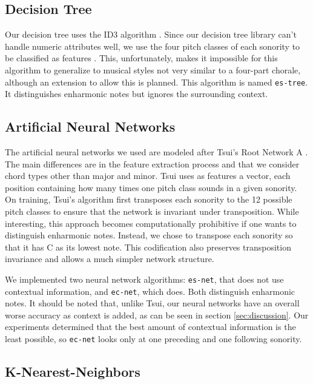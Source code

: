 \documentclass{article}
\begin{document}
\subsection{Decision Tree}
\label{sec:tree}

Our decision tree uses the ID3 algorithm \cite{mitchell:machine}.
Since our decision tree library can't handle numeric attributes well,
we use the four pitch classes of each sonority to be classified as
features . This, unfortunately, makes it impossible for this algorithm
to generalize to musical styles not very similar to a four-part
chorale, although an extension to allow this is planned. This
algorithm is named \texttt{es-tree}. It distinguishes enharmonic notes
but ignores the surrounding context.

\subsection{Artificial Neural Networks}
\label{sec:neural-net}


The artificial neural networks we used are modeled after Tsui's Root
Network A \cite{tsui:harmonic}. The main differences are in the
feature extraction process and that we consider chord types other than
major and minor. Tsui uses as features a vector, each position
containing how many times one pitch class sounds in a given
sonority. On training, Tsui's algorithm first transposes each sonority
to the 12 possible pitch classes to ensure that the network is
invariant under transposition. While interesting, this approach
becomes computationally prohibitive if one wants to distinguish
enharmonic notes. Instead, we chose to transpose each sonority so that
it has C as its lowest note. This codification also preserves
transposition invariance and allows a much simpler network structure.

We implemented two neural network algorithms: \texttt{es-net}, that
does not use contextual information, and \texttt{ec-net}, which
does. Both distinguish enharmonic notes.  It should be noted that,
unlike Tsui, our neural networks have an overall worse accuracy as
context is added, as can be seen in section \ref{sec:discussion}. Our
experiments determined that the best amount of contextual information
is the least possible, so \texttt{ec-net} looks only at one preceding
and one following sonority.


\subsection{K-Nearest-Neighbors}
\label{sec:knn}
\end{document}
